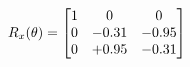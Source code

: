 \documentclass[preview]{standalone}
\begin{document}
\begin{align*}
\special{dvisvgm:raw <g id='unique000'>}R_{x}(\theta) = \begin{bmatrix}1 & 0 & 0 \\0 & -0.31 & -0.95 \\0 & +0.95 & -0.31\end{bmatrix}\special{dvisvgm:raw </g>}
\end{align*}
\end{document}
